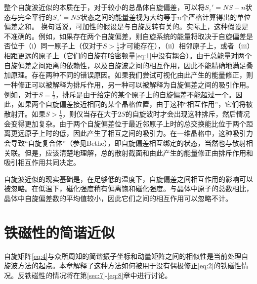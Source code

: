 \documentclass{article}
\begin{document}
整个自旋波近似的本质在于，对于较小的总晶体自旋偏差，可以将$S_z'=NS-n$状态与完全平行的$S_z'=NS$状态之间的能量差视为大约等于$n$个严格计算得出的单位偏差之和。
换句话说，可加性的假设是与自旋反转有关的。实际上，这种假设是不准确的。例如，如果存在两个自旋偏差，则自旋系统的能量将取决于自旋偏差是否位于（i）同一原子上（仅对于$S>\frac{1}{2}$才可能存在），（ii）相邻原子上，或者（iii）相距更远的原子上（它们的自旋在哈密顿量\eqref{eq:1}中没有耦合）。由于总能量对两个自旋偏差之间距离的依赖性，以及自旋波之间的相互作用，因此不能精确地满足叠加原理。存在两种不同的错误原因。如果我们尝试可视化由此产生的能量修正，则一种修正可以被解释为排斥作用，另一种可以被解释为自旋偏差之间的吸引作用。例如，对于$S=\frac{1}{2}$，排斥是由于给定的某个原子上的自旋偏差不能超过一个。因此，如果两个自旋偏差接近相同的某个晶格位置，由于这种“相互作用”，它们将被散射开。如果$S>\frac{1}{2}$，则仅当存在大于$2S$的自旋波时才会出现这种排斥，然后情况会变得更加复杂。由于两个自旋偏差位于最近邻原子上时的总交换能比位于两个距离更远原子上时的低，因此产生了相互之间的吸引力。在一维晶格中，这种吸引力会导致“自旋复合体”（参见Bethe），即自旋偏差相互绑定的状态，当然也与散射相关联。但是，应该清楚地理解，总的散射截面和由此产生的能量修正由排斥作用和吸引相互作用共同决定。

自旋波近似的现实基础是，在足够低的温度下，自旋偏差之间相互作用的影响可以被忽略。在低温下，磁化强度稍有偏离饱和磁化强度。与晶体中原子的总数相比，晶体中自旋偏差数的平均值较小，因此它们之间的相互作用可以忽略不计。




\section{铁磁性的简谐近似} \label{sec:3}

自旋矩阵\eqref{eq:4}与众所周知的简谐振子坐标和动量矩阵之间的相似性是当前处理自旋波方法的起点。本章解释了这种方法如何被用于没有偶极修正\eqref{eq:2}的铁磁性情况。反铁磁性的情况将在第\ref{sec:7}-\ref{eq:8}章中进行讨论。
\end{document}
